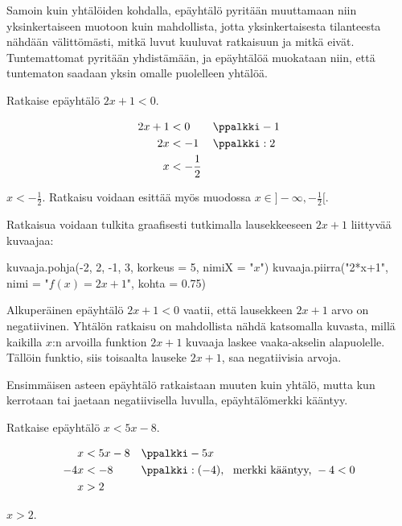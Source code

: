 

Samoin kuin yhtälöiden kohdalla, epäyhtälö pyritään muuttamaan niin yksinkertaiseen muotoon kuin mahdollista, jotta yksinkertaisesta tilanteesta nähdään välittömästi, mitkä luvut kuuluvat ratkaisuun ja mitkä eivät. Tuntemattomat pyritään yhdistämään, ja epäyhtälöä muokataan niin, että tuntematon saadaan yksin omalle puolelleen yhtälöä.

\begin{esimerkki}
Ratkaise epäyhtälö $2x+1 < 0$.
\begin{esimratk}
\begin{align*}
2x+1 &< 0 && \ppalkki -1 \\
2x &< -1 && \ppalkki :2 \\
x &< -\frac{1}{2}
\end{align*}
\end{esimratk}
\begin{esimvast}
$x < -\frac{1}{2}$. 
Ratkaisu voidaan esittää myös muodossa $x \in ]-\infty, -\frac{1}{2}[$.
\end{esimvast}

Ratkaisua voidaan tulkita graafisesti tutkimalla lausekkeeseen $2x+1$ liittyvää kuvaajaa:

\begin{kuva}
kuvaaja.pohja(-2, 2, -1, 3, korkeus = 5, nimiX = "$x$")
kuvaaja.piirra("2*x+1", nimi = "$f(x) = 2x + 1$", kohta = 0.75)
\end{kuva}

Alkuperäinen epäyhtälö $2x+1<0$ vaatii, että lausekkeen $2x+1$ arvo on negatiivinen. Yhtälön ratkaisu on mahdollista nähdä katsomalla kuvasta, millä kaikilla $x$:n arvoilla funktion $2x+1$ kuvaaja laskee vaaka-akselin alapuolelle. Tällöin funktio, siis toisaalta lauseke $2x+1$, saa negatiivisia arvoja.
\end{esimerkki}

Ensimmäisen asteen epäyhtälö ratkaistaan muuten kuin yhtälö, mutta kun kerrotaan tai jaetaan negatiivisella luvulla, epäyhtälömerkki kääntyy.

\begin{esimerkki}
Ratkaise epäyhtälö $x < 5x-8$.
\begin{esimratk}
\begin{align*}
x &< 5x-8 && \ppalkki -5x \\
-4x &< -8 && \ppalkki :(-4), \ \ 
\text{merkki kääntyy, } -4 < 0 \\
x &> 2 &&
\end{align*}
\end{esimratk}
\begin{esimvast}
$x > 2$.
\end{esimvast}
\end{esimerkki}

